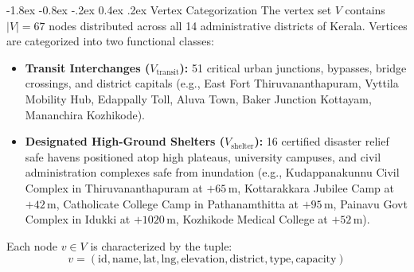\documentclass[12pt,oneside]{report}
\makeatletter
\renewcommand{\subsection}{\@startsection{subsection}{2}{\z@}%
  {-1.8ex \@plus -0.8ex \@minus -.2ex}%
  {0.4ex \@plus .2ex}%
  {\normalfont\normalsize\bfseries}}
\makeatother
\begin{document}
\subsection{Vertex Categorization}
The vertex set $V$ contains $|V| = 67$ nodes distributed across all 14 administrative districts of Kerala. Vertices are categorized into two functional classes:
\begin{itemize}
    \item \textbf{Transit Interchanges ($V_{\text{transit}}$):} 51 critical urban junctions, bypasses, bridge crossings, and district capitals (e.g., East Fort Thiruvananthapuram, Vyttila Mobility Hub, Edappally Toll, Aluva Town, Baker Junction Kottayam, Mananchira Kozhikode).
    \item \textbf{Designated High-Ground Shelters ($V_{\text{shelter}}$):} 16 certified disaster relief safe havens positioned atop high plateaus, university campuses, and civil administration complexes safe from inundation (e.g., Kudappanakunnu Civil Complex in Thiruvananthapuram at $+65$\,m, Kottarakkara Jubilee Camp at $+42$\,m, Catholicate College Camp in Pathanamthitta at $+95$\,m, Painavu Govt Complex in Idukki at $+1020$\,m, Kozhikode Medical College at $+52$\,m).
\end{itemize}
Each node $v \in V$ is characterized by the tuple:
\begin{equation}
    v = (\text{id}, \text{name}, \text{lat}, \text{lng}, \text{elevation}, \text{district}, \text{type}, \text{capacity})
\end{equation}
\end{document}
